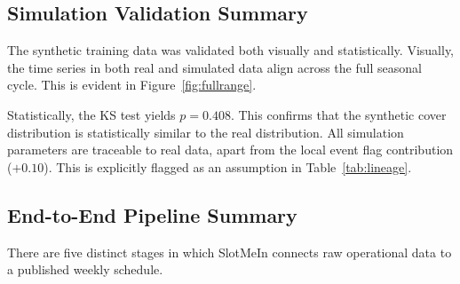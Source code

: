 \documentclass[12pt,a4paper,oneside]{article}
\begin{document}
\subsection{Simulation Validation Summary}

The synthetic training data was validated both visually and statistically. Visually, the time series in both real and simulated data align across the full seasonal cycle. This is evident in Figure~\ref{fig:fullrange}.

Statistically, the KS test yields $p = 0.408$. This confirms that the synthetic cover distribution is statistically similar to the real distribution. All simulation parameters are traceable to real data, apart from the local event flag contribution ($+0.10$). This is explicitly flagged as an assumption in Table~\ref{tab:lineage}.

\subsection{End-to-End Pipeline Summary}

There are five distinct stages in which SlotMeIn connects raw operational data to a published weekly schedule.
\end{document}
